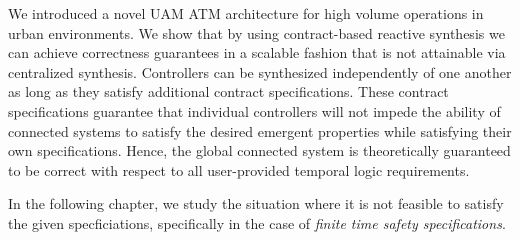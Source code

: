 We introduced a novel UAM ATM architecture for high volume operations in urban environments. We show that by using contract-based reactive synthesis we can achieve  correctness guarantees in a scalable fashion that is not attainable via centralized synthesis. Controllers can be synthesized independently of one another as long as they satisfy additional contract specifications. These contract specifications guarantee that individual controllers will not impede the ability of connected systems to satisfy the desired emergent properties while satisfying their own specifications. Hence, the global connected system is theoretically guaranteed to be correct with respect to all user-provided temporal logic requirements. 

In the following chapter, we study the situation where it is not feasible to satisfy the given specficiations, specifically in the case of \emph{finite time safety specifications}. 
%
